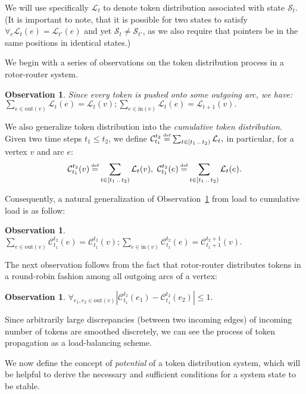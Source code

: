 \documentclass{article}[11pt,letter]
\newtheorem{observation}[definition]{Observation}
\newcommand{\state}{\mathcal{S}}
\newcommand{\inedg}{\mathrm{in}}
\newcommand{\outedg}{\mathrm{out}}
\newcommand{\load}{\mathcal{L}}
\newcommand{\cload}{\mathcal{C}}
\newcommand{\halfrange}[2]{[#1\,..\,#2)}
\newcommand\defeq{\stackrel{\mathclap{\normalfont{\mbox{\text{\tiny{def}}}}}}{=}}
\begin{document}
We will use specifically $\load_t$ to denote token distribution associated with state $\state_t$.
(It is important to note, that it is possible for two states to satisfy $\forall_{e} \load_t(e) = \load_{t'}(e)$ and yet $\state_t \not= \state_{t'}$, as we also require that pointers be in the same positions in identical states.)


We begin with a series of observations on the token distribution process in a rotor-router system.

\begin{observation}
\label{ob:load1}
Since every token is pushed onto some outgoing arc, we have:\\
$\sum_{e \in \outedg(v)} \load_t(e) = \load_{t}(v);
\sum_{e \in \inedg(v)} \load_t(e) = \load_{t+1}(v).$
\end{observation}


We also generalize token distribution into the \emph{cumulative token distribution}. Given two time steps $t_1 \le t_2$, we define
$\cload_{t_1}^{t_2} \defeq \sum_{t \in \halfrange{t_1}{t_2}} \load_t,$
in particular, for a vertex $v$ and arc $e$:
$$\cload_{t_1}^{t_2}(v) \defeq \sum_{t \in \halfrange{t_1}{t_2}} \load_t(v),\ \cload_{t_1}^{t_2}(e) \defeq \sum_{t \in \halfrange{t_1}{t_2}} \load_t(e).$$

Consequently, a natural generalization of Observation~\ref{ob:load1} from load to cumulative load is as follow:

\begin{observation}
\label{ob:cload1}
$\sum_{e \in \outedg(v)} \cload_{t_1}^{t_2}(e) = \cload_{t_1}^{t_2}(v);
\sum_{e \in \inedg(v)} \cload_{t_1}^{t_2}(e) = \cload_{t_1+1}^{t_2+1}(v).$
\end{observation}

The next observation follows from the fact that rotor-router distributes tokens in a round-robin fashion among all outgoing arcs of a vertex:
\begin{observation}
\label{ob:load2}
$\forall_{e_1,e_2 \in \outedg(v)}  |\cload_{t_1}^{t_2}(e_1) - \cload_{t_1}^{t_2}(e_2)| \le 1.$
\end{observation}
Since arbitrarily large discrepancies (between two incoming edges) of incoming number of tokens are smoothed discretely, we can see the process of token propagation as a load-balancing scheme.

We now define the concept of \emph{potential} of a token distribution system, which will be helpful to derive the necessary and sufficient conditions for a system state to be stable.
\end{document}
